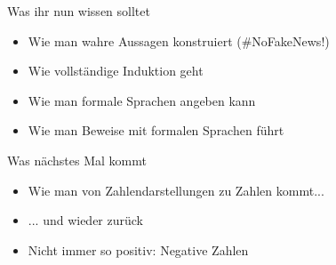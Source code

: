\begin{frame}	
	\begin{block}{Was ihr nun wissen solltet}
		\begin{itemize}
			\item Wie man wahre Aussagen konstruiert \qquad (\#NoFakeNews!) 
			\item Wie vollständige Induktion geht
			\item Wie man formale Sprachen angeben kann
			\item Wie man Beweise mit formalen Sprachen führt
		\end{itemize}
	\end{block}
	
	\begin{block}{Was nächstes Mal kommt}
		\begin{itemize}
			\item Wie man von Zahlendarstellungen zu Zahlen kommt...
			\item[] ... und wieder zurück
			\item Nicht immer so positiv: Negative Zahlen
		\end{itemize}
	\end{block}
\end{frame}



\slideThanks



